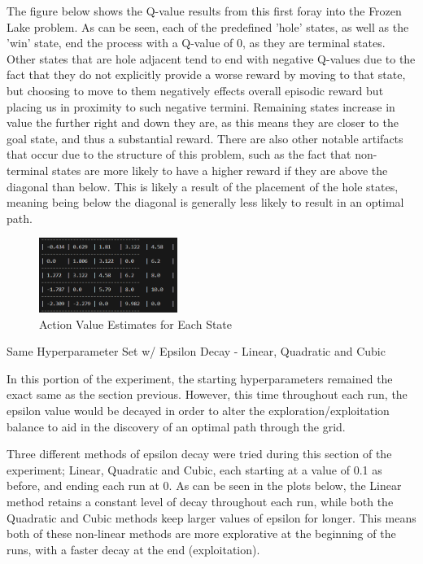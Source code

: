 \documentclass[a4paper,9pt]{scrartcl}
\makeatletter
\renewcommand{\section}{\@startsection{section}{1}{0mm}
  {1.5\baselineskip}
  {1\baselineskip} 
  {\normalfont\Large\bfseries}}
\makeatother
\begin{document}
The figure below shows the Q-value results from this first foray into the Frozen Lake problem. As can be seen, each of the predefined 
'hole' states, as well as the 'win' state, end the process with a Q-value of 0, as they are terminal states. Other states that are hole adjacent 
tend to end with negative Q-values due to the fact that they do not explicitly provide a worse reward by moving to that state, but choosing to move to them 
negatively effects overall episodic reward but placing us in proximity to such negative termini. Remaining states increase in value the further right and 
down they are, as this means they are closer to the goal state, and thus a substantial reward. There are also other notable artifacts that occur due to 
the structure of this problem, such as the fact that non-terminal states are more likely to have a higher reward if they are above the diagonal than below.
This is likely a result of the placement of the hole states, meaning being below the diagonal is generally less likely to result in an optimal path.  


\begin{figure}[H]
\centering
\includegraphics[width=0.4\textwidth]{images/qvalues(1).png}
\caption{Action Value Estimates for Each State}
\label{fig:set1_qvalues}
\end{figure}

\section{Same Hyperparameter Set w/ Epsilon Decay - Linear, Quadratic and Cubic}

In this portion of the experiment, the starting hyperparameters remained the exact same as the section previous. However, this time
throughout each run, the epsilon value would be decayed in order to alter the exploration/exploitation balance to aid in the discovery of
an optimal path through the grid.

Three different methods of epsilon decay were tried during this section of the experiment; Linear, Quadratic and Cubic, each starting at a 
value of 0.1 as before, and ending each run at 0. As can be seen in the plots below, the Linear method retains a constant level of decay
throughout each run, while both the Quadratic and Cubic methods keep larger values of epsilon for longer. This means both of these 
non-linear methods are more explorative at the beginning of the runs, with a faster decay at the end (exploitation).
\end{document}
